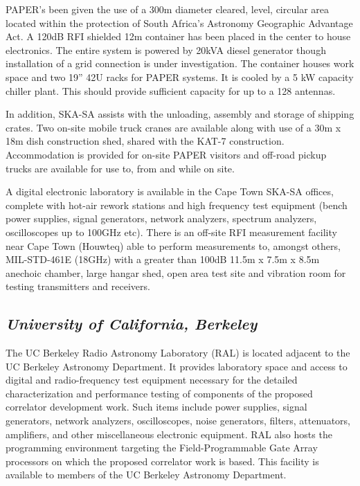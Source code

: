 \documentclass[11pt]{article}
\begin{document}

PAPER’s been given the use of a 300m diameter cleared, level, circular area
located within the protection of South Africa’s Astronomy Geographic Advantage
Act. A 120dB RFI shielded 12m container has been placed in the center to house
electronics. The entire system is powered by 20kVA diesel generator though
installation of a grid connection is under investigation. The container houses
work space and two 19” 42U racks for PAPER systems. It is cooled by a 5 kW
capacity chiller plant. This should provide sufficient capacity for up to a 128
antennas.

In addition, SKA-SA assists with the unloading, assembly and storage of
shipping crates. Two on-site mobile truck cranes are available along with use
of a 30m x 18m dish construction shed, shared with the KAT-7 construction.
Accommodation is provided for on-site PAPER visitors and off-road pickup trucks
are available for use to, from and while on site.

A digital electronic laboratory is available in the Cape Town SKA-SA offices,
complete with hot-air rework stations and high frequency test equipment
(bench power supplies, signal generators, network analyzers, spectrum
analyzers, oscilloscopes up to 100GHz etc). There is an off-site RFI
measurement facility near Cape Town (Houwteq) able to perform measurements to,
amongst others, MIL-STD-461E (18GHz) with a greater than 100dB 11.5m x 7.5m x
8.5m anechoic chamber, large hangar shed, open area test site and vibration
room for testing transmitters and receivers.


\subsection*{\it University of California, Berkeley}


The UC Berkeley Radio Astronomy Laboratory (RAL) is located adjacent to the UC
Berkeley Astronomy Department. It provides laboratory space and access to
digital and radio-frequency test equipment necessary for the detailed
characterization and performance testing of components of the proposed correlator
development work. Such items include power supplies, signal generators, network
analyzers, oscilloscopes, noise generators, filters, attenuators, amplifiers,
and other miscellaneous electronic equipment. RAL also hosts the programming
environment targeting the Field-Programmable Gate Array processors on which the
proposed correlator work is based. This facility is available to members of the
UC Berkeley Astronomy Department.
\end{document}
